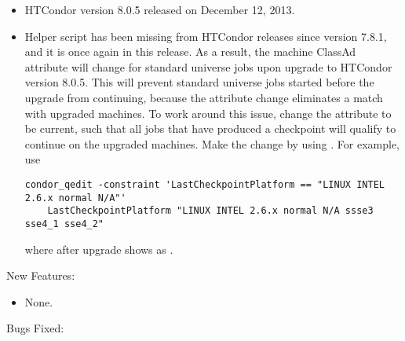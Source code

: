\begin{itemize}

\item HTCondor version 8.0.5 released on December 12, 2013.

\item Helper script  has been missing
from HTCondor releases since version 7.8.1, and it is once again 
in this release.
As a result, the machine ClassAd attribute 
will change for standard universe jobs upon upgrade to HTCondor version 8.0.5.
This will prevent standard universe jobs started before the upgrade
from continuing, because the attribute change eliminates a match 
with upgraded machines. 
To work around this issue,
change the  attribute to be current,
such that all jobs that have produced a checkpoint will qualify to 
continue on the upgraded machines.
Make the change by using . 
For example, use
\footnotesize
\begin{verbatim}
condor_qedit -constraint 'LastCheckpointPlatform == "LINUX INTEL 2.6.x normal N/A"'
    LastCheckpointPlatform "LINUX INTEL 2.6.x normal N/A ssse3 sse4_1 sse4_2"
\end{verbatim}
\normalsize
where  after upgrade shows as
.

\end{itemize}


\noindent New Features:

\begin{itemize}

\item None.

\end{itemize}

\noindent Bugs Fixed:

